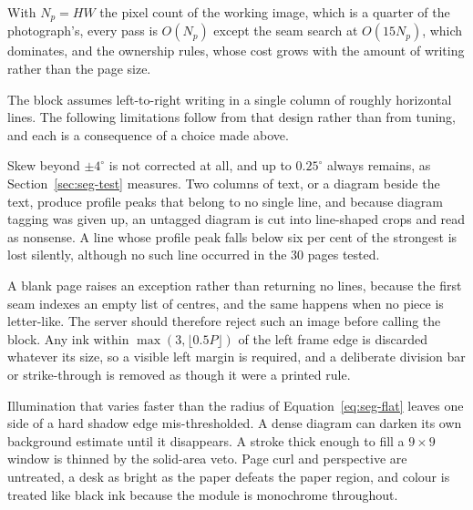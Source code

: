 With $N_p=HW$ the pixel count of the working image, which is a quarter of the photograph's, every pass is $O(N_p)$ except the seam search at $O(15N_p)$, which dominates, and the ownership rules, whose cost grows with the amount of writing rather than the page size.

The block assumes left-to-right writing in a single column of roughly horizontal lines. The following limitations follow from that design rather than from tuning, and each is a consequence of a choice made above.

Skew beyond $\pm4^\circ$ is not corrected at all, and up to $0.25^\circ$ always remains, as Section~\ref{sec:seg-test} measures. Two columns of text, or a diagram beside the text, produce profile peaks that belong to no single line, and because diagram tagging was given up, an untagged diagram is cut into line-shaped crops and read as nonsense. A line whose profile peak falls below six per cent of the strongest is lost silently, although no such line occurred in the 30 pages tested.

A blank page raises an exception rather than returning no lines, because the first seam indexes an empty list of centres, and the same happens when no piece is letter-like. The server should therefore reject such an image before calling the block. Any ink within $\max(3,\lfloor0.5P\rfloor)$ of the left frame edge is discarded whatever its size, so a visible left margin is required, and a deliberate division bar or strike-through is removed as though it were a printed rule.

Illumination that varies faster than the radius of Equation~\ref{eq:seg-flat} leaves one side of a hard shadow edge mis-thresholded. A dense diagram can darken its own background estimate until it disappears. A stroke thick enough to fill a $9\times9$ window is thinned by the solid-area veto. Page curl and perspective are untreated, a desk as bright as the paper defeats the paper region, and colour is treated like black ink because the module is monochrome throughout.

